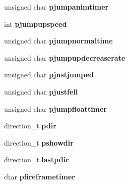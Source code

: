 \begin{DoxyCompactItemize}
\item 
\hypertarget{class_c_player_acb226be7133f934e62da5602f016e3a4}{
unsigned char {\bfseries pjumpanimtimer}}
\label{class_c_player_acb226be7133f934e62da5602f016e3a4}

\item 
\hypertarget{class_c_player_a5f173cfc52f92b86236f39b7ab9d277a}{
int {\bfseries pjumpupspeed}}
\label{class_c_player_a5f173cfc52f92b86236f39b7ab9d277a}

\item 
\hypertarget{class_c_player_a2020dcd5ac0bb9d9426c82849be8b743}{
unsigned char {\bfseries pjumpnormaltime}}
\label{class_c_player_a2020dcd5ac0bb9d9426c82849be8b743}

\item 
\hypertarget{class_c_player_a4fc3bbe16ed72fce4519802e4e73221b}{
unsigned char {\bfseries pjumpupdecreaserate}}
\label{class_c_player_a4fc3bbe16ed72fce4519802e4e73221b}

\item 
\hypertarget{class_c_player_aaf552915990c3b7c279841dab6eb50cd}{
unsigned char {\bfseries pjustjumped}}
\label{class_c_player_aaf552915990c3b7c279841dab6eb50cd}

\item 
\hypertarget{class_c_player_a23f423fd1cde235499cf9a51673a25ce}{
unsigned char {\bfseries pjustfell}}
\label{class_c_player_a23f423fd1cde235499cf9a51673a25ce}

\item 
\hypertarget{class_c_player_aeafc45f8dce94ee02238bdc1559f94bd}{
unsigned char {\bfseries pjumpfloattimer}}
\label{class_c_player_aeafc45f8dce94ee02238bdc1559f94bd}

\item 
\hypertarget{class_c_player_af77d3635079fe9fc00b285b654917114}{
direction\_\-t {\bfseries pdir}}
\label{class_c_player_af77d3635079fe9fc00b285b654917114}

\item 
\hypertarget{class_c_player_a00ecb22b7b76f27f6b5d4df30e68d94a}{
direction\_\-t {\bfseries pshowdir}}
\label{class_c_player_a00ecb22b7b76f27f6b5d4df30e68d94a}

\item 
\hypertarget{class_c_player_afaed3381a62ce9525b9f3f43a8795556}{
direction\_\-t {\bfseries lastpdir}}
\label{class_c_player_afaed3381a62ce9525b9f3f43a8795556}

\item 
\hypertarget{class_c_player_a76e8ce8223ff31d61e473d9619ab51c8}{
char {\bfseries pfireframetimer}}
\label{class_c_player_a76e8ce8223ff31d61e473d9619ab51c8}


\end{DoxyCompactItemize}
